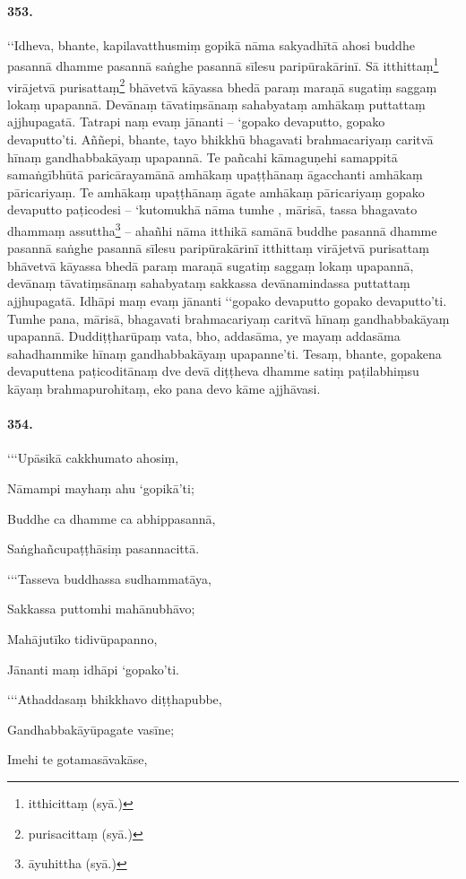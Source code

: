 \paragraph{353.} ‘‘Idheva, bhante, kapilavatthusmiṃ gopikā nāma sakyadhītā ahosi buddhe pasannā dhamme pasannā saṅghe pasannā sīlesu paripūrakārinī. Sā itthittaṃ\footnote{itthicittaṃ (syā.)} virājetvā purisattaṃ\footnote{purisacittaṃ (syā.)} bhāvetvā kāyassa bhedā paraṃ maraṇā sugatiṃ saggaṃ lokaṃ upapannā. Devānaṃ tāvatiṃsānaṃ sahabyataṃ amhākaṃ puttattaṃ ajjhupagatā. Tatrapi naṃ evaṃ jānanti – ‘gopako devaputto, gopako devaputto’ti. Aññepi, bhante, tayo bhikkhū bhagavati brahmacariyaṃ caritvā hīnaṃ gandhabbakāyaṃ upapannā. Te pañcahi kāmaguṇehi samappitā samaṅgībhūtā paricārayamānā amhākaṃ upaṭṭhānaṃ āgacchanti amhākaṃ pāricariyaṃ. Te amhākaṃ upaṭṭhānaṃ āgate amhākaṃ pāricariyaṃ gopako devaputto paṭicodesi – ‘kutomukhā nāma tumhe , mārisā, tassa bhagavato dhammaṃ assuttha\footnote{āyuhittha (syā.)} – ahañhi nāma itthikā samānā buddhe pasannā dhamme pasannā saṅghe pasannā sīlesu paripūrakārinī itthittaṃ virājetvā purisattaṃ bhāvetvā kāyassa bhedā paraṃ maraṇā sugatiṃ saggaṃ lokaṃ upapannā, devānaṃ tāvatiṃsānaṃ sahabyataṃ sakkassa devānamindassa puttattaṃ ajjhupagatā. Idhāpi maṃ evaṃ jānanti ‘‘gopako devaputto gopako devaputto’ti. Tumhe pana, mārisā, bhagavati brahmacariyaṃ caritvā hīnaṃ gandhabbakāyaṃ upapannā. Duddiṭṭharūpaṃ vata, bho, addasāma, ye mayaṃ addasāma sahadhammike hīnaṃ gandhabbakāyaṃ upapanne’ti. Tesaṃ, bhante, gopakena devaputtena paṭicoditānaṃ dve devā diṭṭheva dhamme satiṃ paṭilabhiṃsu kāyaṃ brahmapurohitaṃ, eko pana devo kāme ajjhāvasi.

\paragraph{354.}‘‘‘Upāsikā cakkhumato ahosiṃ,

Nāmampi mayhaṃ ahu ‘gopikā’ti;

Buddhe ca dhamme ca abhippasannā,

Saṅghañcupaṭṭhāsiṃ pasannacittā.

‘‘‘Tasseva buddhassa sudhammatāya,

Sakkassa puttomhi mahānubhāvo;

Mahājutīko tidivūpapanno,

Jānanti maṃ idhāpi ‘gopako’ti.

‘‘‘Athaddasaṃ bhikkhavo diṭṭhapubbe,

Gandhabbakāyūpagate vasīne;

Imehi te gotamasāvakāse,

